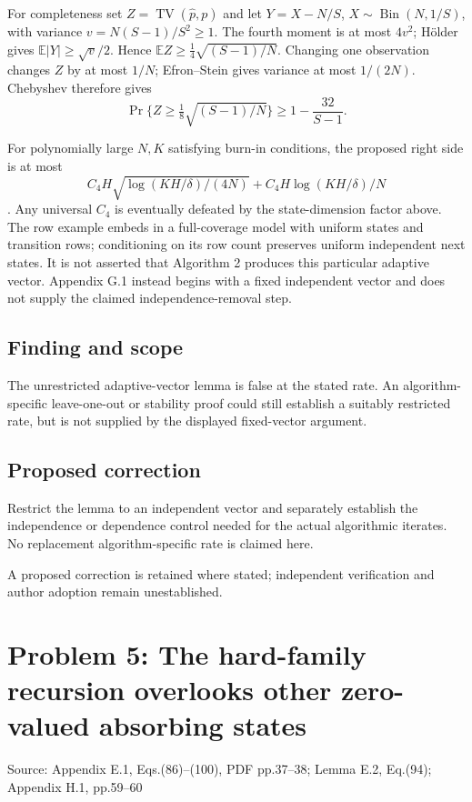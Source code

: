 \documentclass[11pt]{article}
\begin{document}
For completeness set \(Z=\operatorname{TV}(\hat p,p)\) and let \(Y=X-N/S\), \(X\sim\operatorname{Bin}(N,1/S)\), with variance \(v=N(S-1)/S^2\ge1\). The fourth moment is at most \(4v^2\); Hölder gives \(\mathbb E|Y|\ge\sqrt v/2\). Hence \(\mathbb EZ\ge\frac14\sqrt{(S-1)/N}\). Changing one observation changes \(Z\) by at most \(1/N\); Efron–Stein gives variance at most \(1/(2N)\). Chebyshev therefore gives \[\Pr\{Z\ge\tfrac18\sqrt{(S-1)/N}\}\ge1-\frac{32}{S-1}.\]

For polynomially large \(N,K\) satisfying burn-in conditions, the proposed right side is at most \[C_4H\sqrt{\log(KH/\delta)/(4N)}+C_4H\log(KH/\delta)/N\]. Any universal \(C_4\) is eventually defeated by the state-dimension factor above. The row example embeds in a full-coverage model with uniform states and transition rows; conditioning on its row count preserves uniform independent next states. It is not asserted that Algorithm 2 produces this particular adaptive vector. Appendix G.1 instead begins with a fixed independent vector and does not supply the claimed independence-removal step.

\subsection*{Finding and scope}

The unrestricted adaptive-vector lemma is false at the stated rate. An algorithm-specific leave-one-out or stability proof could still establish a suitably restricted rate, but is not supplied by the displayed fixed-vector argument.

\subsection*{Proposed correction}

Restrict the lemma to an independent vector and separately establish the independence or dependence control needed for the actual algorithmic iterates. No replacement algorithm-specific rate is claimed here.

A proposed correction is retained where stated; independent verification and author adoption remain unestablished.

\section*{Problem 5: The hard-family recursion overlooks other zero-valued absorbing states}

Source: Appendix E.1, Eqs.(86)–(100), PDF pp.37–38; Lemma E.2, Eq.(94); Appendix H.1, pp.59–60
\end{document}
